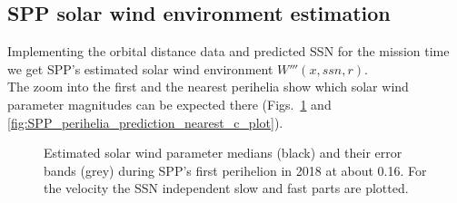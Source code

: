 \subsection{SPP solar wind environment estimation}
Implementing the orbital distance data and predicted SSN for the mission time we get SPP's estimated solar wind environment $W'''(x,ssn,r)$.\\
The zoom into the first and the nearest perihelia show which solar wind parameter magnitudes can be expected there (Figs.~\ref{fig:SPP_perihelia_prediction_c_plot} and \ref{fig:SPP_perihelia_prediction_nearest_c_plot}).\\
\begin{figure}
	\caption{Estimated solar wind parameter medians (black) and their error bands (grey) during SPP's first perihelion in 2018 at about \SI{0.16}{\au}. For the velocity the SSN independent slow and fast parts are plotted.}
	\label{fig:SPP_perihelia_prediction_c_plot}
\end{figure}
